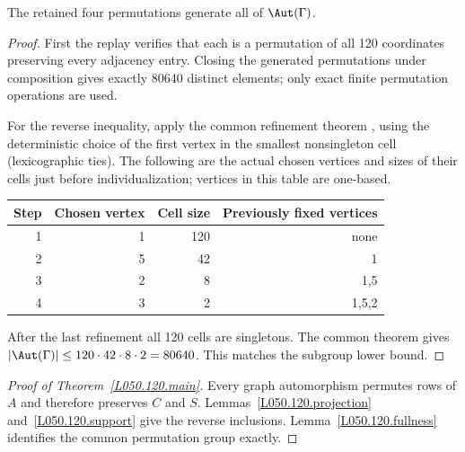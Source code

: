 \begin{lemma}\label{L050.120.fullness}
The retained four permutations generate all of $\Aut(\Gamma)$.
\end{lemma}
\begin{proof}
First the replay verifies that each is a permutation of all 120 coordinates preserving every adjacency entry. Closing the generated permutations under composition gives exactly 80640 distinct elements; only exact finite permutation operations are used.

For the reverse inequality, apply the common refinement theorem \cite[Theorem~6.4]{U}, using the deterministic choice of the first vertex in the smallest nonsingleton cell (lexicographic ties). 
The following are the actual chosen vertices and sizes of their cells just before individualization; vertices in this table are one-based.
\begin{center}\begin{tabular}{rrrr}\toprule
Step&Chosen vertex&Cell size&Previously fixed vertices\\\midrule
1&1&120&none\\
2&5&42&1\\
3&2&8&1,5\\
4&3&2&1,5,2\\\bottomrule
\end{tabular}\end{center}
After the last refinement all 120 cells are singletons. The common theorem gives $|\Aut(\Gamma)|\le120\cdot42\cdot8\cdot2=80640$.
This matches the subgroup lower bound.
\end{proof}


\begin{proof}[Proof of Theorem~\ref{L050.120.main}]
Every graph automorphism permutes rows of $A$ and therefore preserves $C$ and $S$. Lemmas~\ref{L050.120.projection} and~\ref{L050.120.support} give the reverse inclusions. Lemma~\ref{L050.120.fullness} identifies the common permutation group exactly.
\end{proof}

